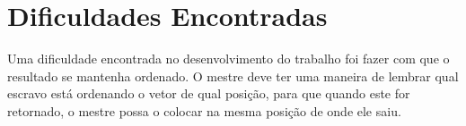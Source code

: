 \section{Dificuldades Encontradas}

	Uma dificuldade encontrada no desenvolvimento do trabalho foi fazer com que o resultado se mantenha ordenado. O mestre deve ter uma maneira de lembrar qual escravo está ordenando o vetor de qual posição, para que quando este for retornado, o mestre possa o colocar na mesma posição de onde ele saiu.

